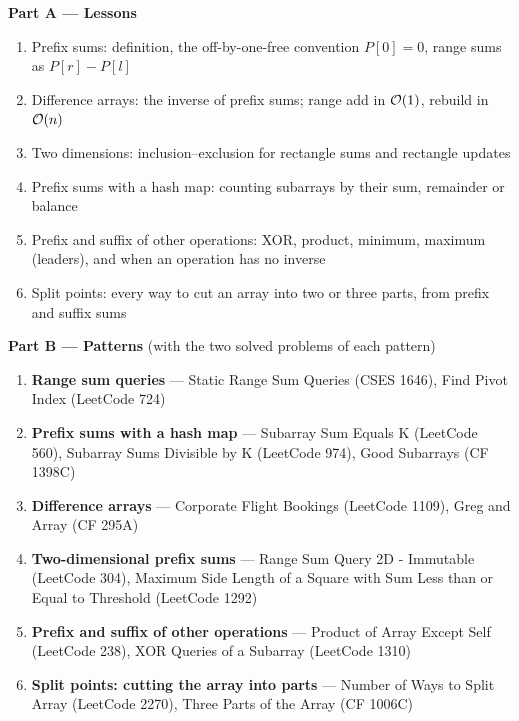 \begin{plannedbox}
\textbf{Part A --- Lessons}
\begin{enumerate}[leftmargin=*, label=\textbf{A\arabic*.}, itemsep=1pt]
    \item Prefix sums: definition, the off-by-one-free convention $P[0]=0$, range sums as $P[r]-P[l]$
    \item Difference arrays: the inverse of prefix sums; range add in $\mathcal{O}(1)$, rebuild in $\mathcal{O}(n)$
    \item Two dimensions: inclusion--exclusion for rectangle sums and rectangle updates
    \item Prefix sums with a hash map: counting subarrays by their sum, remainder or balance
    \item Prefix and suffix of other operations: XOR, product, minimum, maximum (leaders), and when an operation has no inverse
    \item Split points: every way to cut an array into two or three parts, from prefix and suffix sums
\end{enumerate}
\textbf{Part B --- Patterns} (with the two solved problems of each pattern)
\begin{enumerate}[leftmargin=*, label=\textbf{P\arabic*.}, itemsep=1pt]
    \item \textbf{Range sum queries} --- Static Range Sum Queries {\small\color{darkgray}(CSES 1646)}, Find Pivot Index {\small\color{darkgray}(LeetCode 724)}
    \item \textbf{Prefix sums with a hash map} --- Subarray Sum Equals K {\small\color{darkgray}(LeetCode 560)}, Subarray Sums Divisible by K {\small\color{darkgray}(LeetCode 974)}, Good Subarrays {\small\color{darkgray}(CF 1398C)}
    \item \textbf{Difference arrays} --- Corporate Flight Bookings {\small\color{darkgray}(LeetCode 1109)}, Greg and Array {\small\color{darkgray}(CF 295A)}
    \item \textbf{Two-dimensional prefix sums} --- Range Sum Query 2D - Immutable {\small\color{darkgray}(LeetCode 304)}, Maximum Side Length of a Square with Sum Less than or Equal to Threshold {\small\color{darkgray}(LeetCode 1292)}
    \item \textbf{Prefix and suffix of other operations} --- Product of Array Except Self {\small\color{darkgray}(LeetCode 238)}, XOR Queries of a Subarray {\small\color{darkgray}(LeetCode 1310)}
    \item \textbf{Split points: cutting the array into parts} --- Number of Ways to Split Array {\small\color{darkgray}(LeetCode 2270)}, Three Parts of the Array {\small\color{darkgray}(CF 1006C)}
\end{enumerate}
\end{plannedbox}
